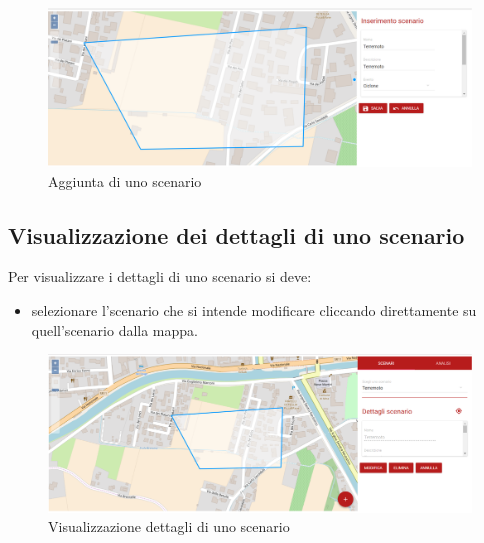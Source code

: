 	\begin{figure}[H]
	\centering
	\includegraphics[width=\textwidth]{img/aggiunta_scenario.png}
	\caption{Aggiunta di uno scenario}
	\end{figure}

\subsection{Visualizzazione dei dettagli di uno scenario}
	Per visualizzare i dettagli di uno scenario si deve:
	\begin{itemize}
		\item selezionare l'scenario che si intende modificare cliccando direttamente su quell'scenario dalla mappa.
	\end{itemize}
	
	\begin{figure}[H]
	\centering
	\includegraphics[width=\textwidth]{img/visualizzazione_scenario.png}
	\caption{Visualizzazione dettagli di uno scenario}
	\end{figure}

